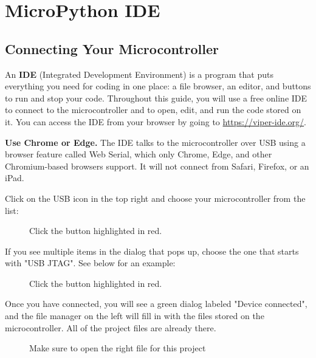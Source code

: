 \chapter{MicroPython IDE} \label{ide}

\section{Connecting Your Microcontroller}
An \textbf{IDE} (Integrated Development Environment) is a program that puts everything you need
for coding in one place: a file browser, an editor, and buttons to run and stop your code.
Throughout this guide, you will use a free online IDE to connect to the microcontroller and to
open, edit, and run the code stored on it. You can access the IDE from your browser by going to
\url{https://viper-ide.org/}.

\begin{tcolorbox}[colback=yellow!10!white,colframe=yellow!50!black]
    \textbf{Use Chrome or Edge.} The IDE talks to the microcontroller over USB using a browser
    feature called Web Serial, which only Chrome, Edge, and other Chromium-based browsers support.
    It will not connect from Safari, Firefox, or an iPad.
\end{tcolorbox}

Click on the USB icon in the top right and choose your microcontroller from the list:

\begin{figure}[H]
    \centering
    \caption{Click the button highlighted in red.}
\end{figure}

If you see multiple items in the dialog that pops up, choose the one that starts with "USB JTAG". See below for an example:
\begin{figure}[H]
    \centering
    \caption{Click the button highlighted in red.}
\end{figure}

Once you have connected, you will see a green dialog labeled "Device connected", and the file
manager on the left will fill in with the files stored on the microcontroller. All of the project
files are already there.
\begin{figure}[H]
    \centering
    \caption{Make sure to open the right file for this project}
\end{figure}

